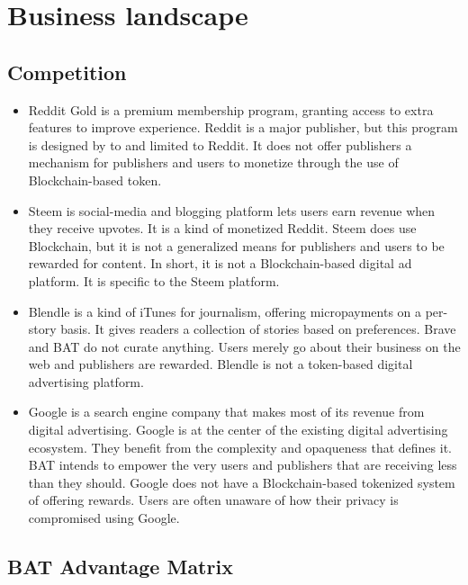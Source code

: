 \documentclass[11pt]{article}
\begin{document}
\section{Business landscape}
\label{sec-5}
\subsection{Competition}
\label{sec-5-1}
\begin{itemize}
\item{Reddit Gold is a premium membership program, granting access to extra features to improve experience. Reddit is a major publisher, but this program is designed by to and limited to Reddit. It does not offer publishers a mechanism for publishers and users to monetize through the use of Blockchain-based token.}
\item{Steem is social-media and blogging platform lets users earn revenue when they receive upvotes. It is a kind of monetized Reddit. Steem does use Blockchain, but it is not a generalized means for publishers and users to be rewarded for content. In short, it is not a Blockchain-based digital ad platform. It is specific to the Steem platform. }
\item{Blendle is a kind of iTunes for journalism, offering micropayments on a per-story basis. It gives  readers a collection of stories based on preferences. Brave and BAT do not curate anything. Users merely go about their business on the web and publishers are rewarded. Blendle is not a token-based digital advertising platform. }
\item{Google is a search engine company that makes most of its revenue from digital advertising. Google is at the center of the existing digital advertising ecosystem. They benefit from the complexity and opaqueness that defines it. BAT intends to empower the very users and publishers that are receiving less than they should. Google does not have a Blockchain-based tokenized system of offering rewards. Users are often unaware of how their privacy is compromised using Google.}
\end{itemize}

\subsection{BAT Advantage Matrix}
\label{sec-5-2}
\end{document}

